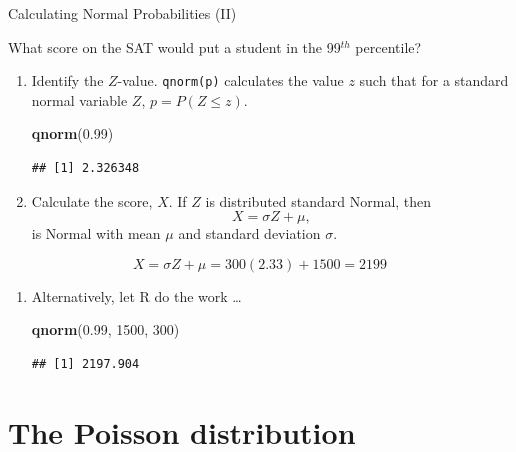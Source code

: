 \documentclass[ignorenonframetext,aspectratio=169]{beamer}
\newenvironment{Shaded}{\begin{snugshade}}{\end{snugshade}}
\newcommand{\KeywordTok}[1]{\textcolor[rgb]{0.13,0.29,0.53}{\textbf{#1}}}
\newcommand{\DecValTok}[1]{\textcolor[rgb]{0.00,0.00,0.81}{#1}}
\newcommand{\FloatTok}[1]{\textcolor[rgb]{0.00,0.00,0.81}{#1}}
\newcommand{\NormalTok}[1]{#1}
\begin{document}
\begin{frame}[fragile]{Calculating Normal Probabilities (II)}

What score on the SAT would put a student in the 99\(^{th}\) percentile?

\footnotesize

\begin{enumerate}
\def\labelenumi{\arabic{enumi}.}
\item
  Identify the \(Z\)-value. \texttt{qnorm(p)} calculates the value \(z\)
  such that for a standard normal variable \(Z\), \(p = P(Z \leq z)\).

\begin{Shaded}
\begin{Highlighting}[]
\KeywordTok{qnorm}\NormalTok{(}\FloatTok{0.99}\NormalTok{)}
\end{Highlighting}
\end{Shaded}

\begin{verbatim}
## [1] 2.326348
\end{verbatim}
\item
  Calculate the score, \(X\). If \(Z\) is distributed standard Normal,
  then \[X = \sigma Z + \mu,\] is Normal with mean \(\mu\) and standard
  deviation \(\sigma\).
\end{enumerate}

\[X = \sigma Z + \mu = 300(2.33) + 1500 = 2199\]

\begin{enumerate}
\def\labelenumi{\arabic{enumi}.}
\setcounter{enumi}{2}
\item
  Alternatively, let \textsf{R} do the work \ldots{}

\begin{Shaded}
\begin{Highlighting}[]
\KeywordTok{qnorm}\NormalTok{(}\FloatTok{0.99}\NormalTok{, }\DecValTok{1500}\NormalTok{, }\DecValTok{300}\NormalTok{)}
\end{Highlighting}
\end{Shaded}

\begin{verbatim}
## [1] 2197.904
\end{verbatim}
\end{enumerate}

\end{frame}

\section{The Poisson distribution}\label{the-poisson-distribution}
\end{document}

